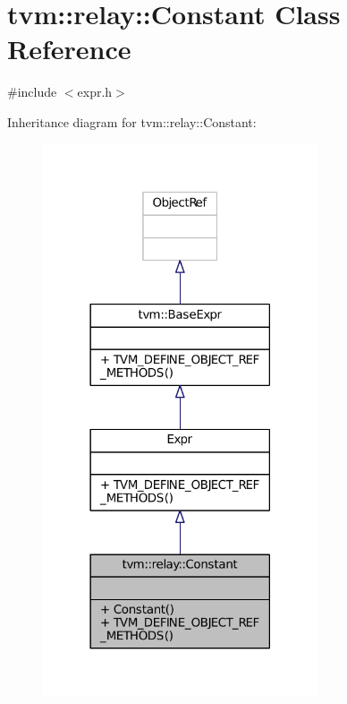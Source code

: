 \hypertarget{classtvm_1_1relay_1_1Constant}{}\section{tvm\+:\+:relay\+:\+:Constant Class Reference}
\label{classtvm_1_1relay_1_1Constant}


{\ttfamily \#include $<$expr.\+h$>$}



Inheritance diagram for tvm\+:\+:relay\+:\+:Constant\+:
\nopagebreak
\begin{figure}[H]
\begin{center}
\leavevmode
\includegraphics[width=230pt]{classtvm_1_1relay_1_1Constant__inherit__graph}
\end{center}
\end{figure}



